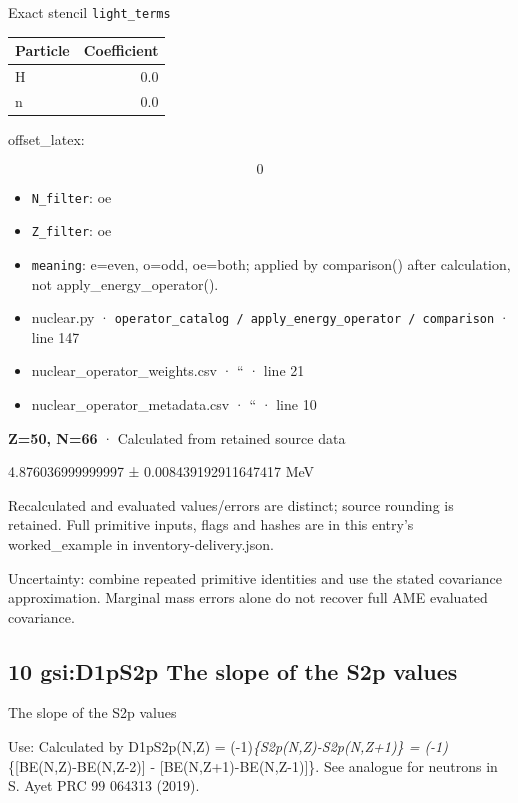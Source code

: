\documentclass[
  11pt,
  letterpaper,
]{article}
\begin{document}
Exact stencil \texttt{light\_terms}

\begin{longtable}[]{@{}lr@{}}
\toprule\noalign{}
Particle & Coefficient \\
\midrule\noalign{}
\endhead
\bottomrule\noalign{}
\endlastfoot
H & 0.0 \\
n & 0.0 \\
\end{longtable}

offset\_latex:

\[
0
\]

\begin{itemize}
\item
  \texttt{N\_filter}: oe
\item
  \texttt{Z\_filter}: oe
\item
  \texttt{meaning}: e=even, o=odd, oe=both; applied by comparison()
  after calculation, not apply\_energy\_operator().
\item
  nuclear.py ·
  \texttt{operator\_catalog\ /\ apply\_energy\_operator\ /\ comparison}
  · line 147
\item
  nuclear\_operator\_weights.csv · `` · line 21
\item
  nuclear\_operator\_metadata.csv · `` · line 10
\end{itemize}

\textbf{Z=50, N=66} · Calculated from retained source data

4.876036999999997 ± 0.008439192911647417 MeV

Recalculated and evaluated values/errors are distinct; source rounding
is retained. Full primitive inputs, flags and hashes are in this entry's
worked\_example in inventory-delivery.json.

Uncertainty: combine repeated primitive identities and use the stated
covariance approximation. Marginal mass errors alone do not recover full
AME evaluated covariance.

\subsection{10 gsi:D1pS2p The slope of the S2p
values}\label{gsid1ps2p-the-slope-of-the-s2p-values}

The slope of the S2p values

Use: Calculated by D1pS2p(N,Z) = (-1)\emph{\{S2p(N,Z)-S2p(N,Z+1)\} =
(-1)}\{{[}BE(N,Z)-BE(N,Z-2){]} - {[}BE(N,Z+1)-BE(N,Z-1){]}\}. See
analogue for neutrons in S. Ayet PRC 99 064313 (2019).
\end{document}
